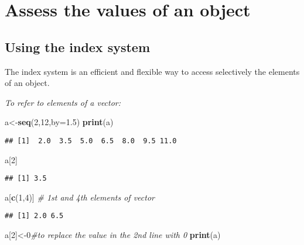 \documentclass[]{book}
\newenvironment{Shaded}{\begin{snugshade}}{\end{snugshade}}
\newcommand{\KeywordTok}[1]{\textcolor[rgb]{0.13,0.29,0.53}{\textbf{#1}}}
\newcommand{\DataTypeTok}[1]{\textcolor[rgb]{0.13,0.29,0.53}{#1}}
\newcommand{\DecValTok}[1]{\textcolor[rgb]{0.00,0.00,0.81}{#1}}
\newcommand{\FloatTok}[1]{\textcolor[rgb]{0.00,0.00,0.81}{#1}}
\newcommand{\CommentTok}[1]{\textcolor[rgb]{0.56,0.35,0.01}{\textit{#1}}}
\newcommand{\NormalTok}[1]{#1}
\theoremstyle{definition}
\theoremstyle{definition}
\theoremstyle{definition}
\theoremstyle{remark}
\begin{document}
\section{Assess the values of an
object}\label{assess-the-values-of-an-object}

\subsection{Using the index system}\label{using-the-index-system}

The index system is an efficient and flexible way to access selectively
the elements of an object.

\emph{To refer to elements of a vector:}

\begin{Shaded}
\begin{Highlighting}[]
\NormalTok{a<-}\KeywordTok{seq}\NormalTok{(}\DecValTok{2}\NormalTok{,}\DecValTok{12}\NormalTok{,}\DataTypeTok{by=}\FloatTok{1.5}\NormalTok{)}
\KeywordTok{print}\NormalTok{(a)}
\end{Highlighting}
\end{Shaded}

\begin{verbatim}
## [1]  2.0  3.5  5.0  6.5  8.0  9.5 11.0
\end{verbatim}

\begin{Shaded}
\begin{Highlighting}[]
\NormalTok{a[}\DecValTok{2}\NormalTok{]}
\end{Highlighting}
\end{Shaded}

\begin{verbatim}
## [1] 3.5
\end{verbatim}

\begin{Shaded}
\begin{Highlighting}[]
\NormalTok{a[}\KeywordTok{c}\NormalTok{(}\DecValTok{1}\NormalTok{,}\DecValTok{4}\NormalTok{)] }\CommentTok{# 1st and 4th elements of vector}
\end{Highlighting}
\end{Shaded}

\begin{verbatim}
## [1] 2.0 6.5
\end{verbatim}

\begin{Shaded}
\begin{Highlighting}[]
\NormalTok{a[}\DecValTok{2}\NormalTok{]<-}\DecValTok{0}\CommentTok{#to replace the value in the 2nd line with 0}
\KeywordTok{print}\NormalTok{(a)}
\end{Highlighting}
\end{Shaded}
\end{document}
